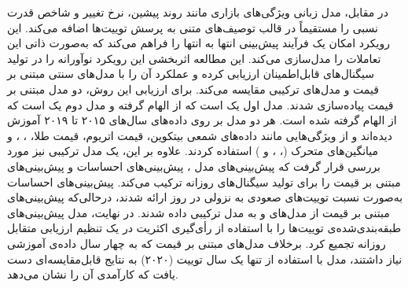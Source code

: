 در مقابل، مدل زبانی  ویژگی‌های بازاری مانند روند پیشین، نرخ تغییر و شاخص قدرت نسبی را مستقیماً در قالب توصیف‌های متنی به پرسش توییت‌ها اضافه می‌کند. این رویکرد امکان یک فرآیند پیش‌بینی انتها به انتها را فراهم می‌کند که به‌صورت ذاتی این تعاملات را مدل‌سازی می‌کند. این مطالعه اثربخشی این رویکرد نوآورانه را در تولید سیگنال‌های قابل‌اطمینان ارزیابی کرده و عملکرد آن را با مدل‌های سنتی مبتنی بر قیمت و مدل‌های ترکیبی مقایسه می‌کند. برای ارزیابی این روش، دو مدل مبتنی بر قیمت پیاده‌سازی شدند. مدل اول یک  است که از \cite{prebit_zou_2023} الهام گرفته و مدل دوم یک  است که از \cite{zha2022time} الهام گرفته شده است. هر دو مدل بر روی داده‌های سال‌های ۲۰۱۵ تا ۲۰۱۹ آموزش دیده‌اند و از ویژگی‌هایی مانند داده‌های شمعی بیتکوین، قیمت اتریوم، قیمت طلا، ، ،  و میانگین‌های متحرک (، ،  و ) استفاده کردند. علاوه بر این، یک مدل ترکیبی نیز مورد بررسی قرار گرفت که پیش‌بینی‌های مدل ، پیش‌بینی‌های احساسات و پیش‌بینی‌های مبتنی بر قیمت را برای تولید سیگنال‌های روزانه ترکیب می‌کند. پیش‌بینی‌های احساسات به‌صورت نسبت توییت‌های صعودی به نزولی در روز ارائه شدند، درحالی‌که پیش‌بینی‌های مبتنی بر قیمت از مدل‌های  و  به مدل ترکیبی داده شدند. در نهایت، مدل  پیش‌بینی‌های طبقه‌بندی‌شده‌ی توییت‌ها را با استفاده از رأی‌گیری اکثریت در یک تنظیم ارزیابی متقابل روزانه تجمیع کرد. برخلاف مدل‌های مبتنی بر قیمت که به چهار سال داده‌ی آموزشی نیاز داشتند، مدل  با استفاده از تنها یک سال توییت (۲۰۲۰) به نتایج قابل‌مقایسه‌ای دست یافت که کارآمدی آن را نشان می‌دهد.

